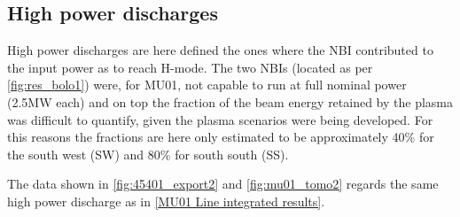 \subsection{High power discharges}

High power discharges are here defined the ones where the NBI contributed to the input power as to reach H-mode. The two NBIs (located as per \autoref{fig:res_bolo1}) were, for MU01, not capable to run at full nominal power (2.5MW each) and on top the fraction of the beam energy retained by the plasma was difficult to quantify, given the plasma scenarios were being developed. For this reasons the fractions are here only estimated to be approximately 40\% for the south west (SW) and 80\% for south south (SS).

The data shown in \autoref{fig:45401_export2} and \ref{fig:mu01_tomo2} regards the same high power discharge as in \autoref{MU01 Line integrated results}.

